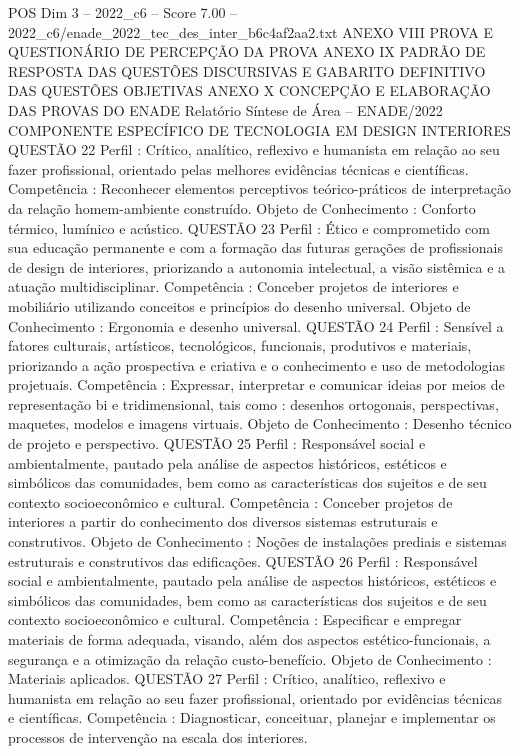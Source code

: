\begin{textsample}{POS Dim 3 – 2022\_c6 – Score 7.00 – 2022\_c6/enade\_2022\_tec\_des\_inter\_b6c4af2aa2.txt}
ANEXO VIII PROVA E QUESTIONÁRIO DE PERCEPÇÃO DA PROVA ANEXO IX PADRÃO DE RESPOSTA DAS QUESTÕES DISCURSIVAS E GABARITO DEFINITIVO DAS QUESTÕES OBJETIVAS ANEXO X CONCEPÇÃO E ELABORAÇÃO DAS PROVAS DO ENADE Relatório Síntese de Área – ENADE/2022 COMPONENTE ESPECÍFICO DE TECNOLOGIA EM DESIGN INTERIORES QUESTÃO 22 Perfil : Crítico, analítico, reflexivo e humanista em relação ao seu fazer profissional, orientado pelas melhores evidências técnicas e científicas.
Competência : Reconhecer elementos perceptivos teórico-práticos de interpretação da relação homem-ambiente construído.
Objeto de Conhecimento : Conforto térmico, lumínico e acústico.
QUESTÃO 23 Perfil : Ético e comprometido com sua educação permanente e com a formação das futuras gerações de profissionais de design de interiores, priorizando a autonomia intelectual, a visão sistêmica e a atuação multidisciplinar.
Competência : Conceber projetos de interiores e mobiliário utilizando conceitos e princípios do desenho universal.
Objeto de Conhecimento : Ergonomia e desenho universal.
QUESTÃO 24 Perfil : Sensível a fatores culturais, artísticos, tecnológicos, funcionais, produtivos e materiais, priorizando a ação prospectiva e criativa e o conhecimento e uso de metodologias projetuais.
Competência : Expressar, interpretar e comunicar ideias por meios de representação bi e tridimensional, tais como : desenhos ortogonais, perspectivas, maquetes, modelos e imagens virtuais.
Objeto de Conhecimento : Desenho técnico de projeto e perspectivo.
QUESTÃO 25 Perfil : Responsável social e ambientalmente, pautado pela análise de aspectos históricos, estéticos e simbólicos das comunidades, bem como as características dos sujeitos e de seu contexto socioeconômico e cultural.
Competência : Conceber projetos de interiores a partir do conhecimento dos diversos sistemas estruturais e construtivos.
Objeto de Conhecimento : Noções de instalações prediais e sistemas estruturais e construtivos das edificações.
QUESTÃO 26 Perfil : Responsável social e ambientalmente, pautado pela análise de aspectos históricos, estéticos e simbólicos das comunidades, bem como as características dos sujeitos e de seu contexto socioeconômico e cultural.
Competência : Especificar e empregar materiais de forma adequada, visando, além dos aspectos estético-funcionais, a segurança e a otimização da relação custo-benefício.
Objeto de Conhecimento : Materiais aplicados.
QUESTÃO 27 Perfil : Crítico, analítico, reflexivo e humanista em relação ao seu fazer profissional, orientado por evidências técnicas e científicas.
Competência : Diagnosticar, conceituar, planejar e implementar os processos de intervenção na escala dos interiores.

\end{textsample}
